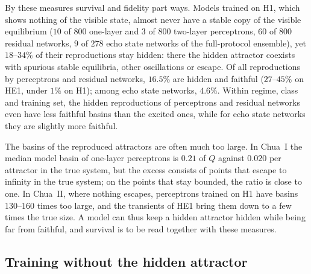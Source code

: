 \documentclass[aip,cha,reprint,amsmath,amssymb,longbibliography]{revtex4-2}
\theoremstyle{definition}
\begin{document}
By these measures survival and fidelity part ways. Models trained on H1, which shows nothing of the visible state, almost
never have a stable copy of the visible equilibrium ($10$ of $800$ one-layer and $3$ of $800$ two-layer perceptrons, $60$ of
$800$ residual networks, $9$ of $278$ echo state networks of the full-protocol ensemble), yet $18$--$34\%$ of their
reproductions stay hidden: there the hidden attractor coexists with spurious stable equilibria, other oscillations or
escape. Of all reproductions by perceptrons and residual networks, $16.5\%$ are hidden and faithful ($27$--$45\%$ on HE1,
under $1\%$ on H1); among echo state networks, $4.6\%$. Within regime, class and training set, the hidden reproductions of
perceptrons and residual networks even have less faithful basins than the excited ones, while for echo state networks they
are slightly more faithful.

The basins of the reproduced attractors are often much too large. In Chua~I the median model basin of one-layer
perceptrons is $0.21$ of $Q$ against $0.020$ per attractor in the true system, but the excess consists of points that escape
to infinity in the true system; on the points that stay bounded, the ratio is close to one. In Chua~II, where nothing
escapes, perceptrons trained on H1 have basins $130$--$160$ times too large, and the transients of HE1 bring them down to a
few times the true size. A model can thus keep a hidden attractor hidden while being far from faithful, and survival is to
be read together with these measures.

\subsection{Training without the hidden attractor}
\label{sec:e1}
\end{document}

